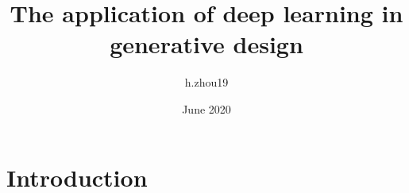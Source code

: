 \documentclass{article}
\title{The application of deep learning in generative design}
\author{h.zhou19 }
\date{June 2020}
\begin{document}
\maketitle

\section{Introduction}
\end{document}
